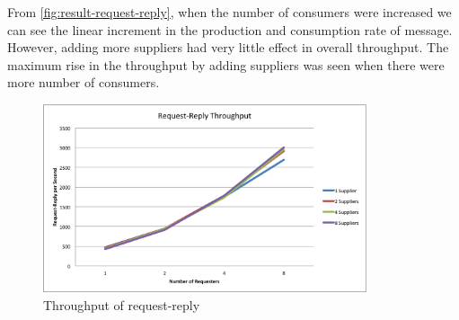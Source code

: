   From \autoref{fig:result-request-reply}, when the number of consumers were increased we can see the linear increment in the production and consumption rate of message. However, adding more suppliers had very little effect in overall throughput. The maximum rise in the throughput by adding suppliers was seen when there were more number of consumers.
\begin{figure}[H]
  \centering
  \includegraphics[width=0.85\textwidth]{figures/09request-reply}
  \caption[Throughput of request-reply]{Throughput of request-reply}
  \label{fig:result-request-reply}
\end{figure}
